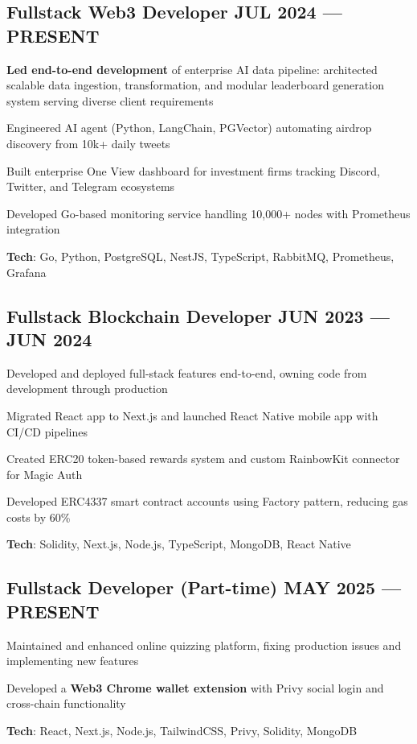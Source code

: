 \documentclass[letter,10pt]{article}
\begin{document}
\subsection{{Fullstack Web3 Developer \hfill JUL 2024 --- PRESENT}}
\begin{zitemize}
  \item \textbf{Led end-to-end development} of enterprise AI data pipeline: architected scalable data ingestion, transformation, and modular leaderboard generation system serving diverse client requirements
  \item Engineered AI agent (Python, LangChain, PGVector) automating airdrop discovery from 10k+ daily tweets
  \item Built enterprise One View dashboard for investment firms tracking Discord, Twitter, and Telegram ecosystems
  \item Developed Go-based monitoring service handling 10,000+ nodes with Prometheus integration
  \item \textbf{Tech}: Go, Python, PostgreSQL, NestJS, TypeScript, RabbitMQ, Prometheus, Grafana
\end{zitemize}


\subsection{{Fullstack Blockchain Developer \hfill JUN 2023 --- JUN 2024}}
\begin{zitemize}
  \item Developed and deployed full-stack features end-to-end, owning code from development through production
  \item Migrated React app to Next.js and launched React Native mobile app with CI/CD pipelines
  \item Created ERC20 token-based rewards system and custom RainbowKit connector for Magic Auth
  \item Developed ERC4337 smart contract accounts using Factory pattern, reducing gas costs by 60\%
  \item \textbf{Tech}: Solidity, Next.js, Node.js, TypeScript, MongoDB, React Native
\end{zitemize}

\subsection{{Fullstack Developer (Part-time) \hfill MAY 2025 --- PRESENT}}
\begin{zitemize}
  \item Maintained and enhanced online quizzing platform, fixing production issues and implementing new features
  \item Developed a \textbf{Web3 Chrome wallet extension} with Privy social login and cross-chain functionality
  \item \textbf{Tech}: React, Next.js, Node.js, TailwindCSS, Privy, Solidity, MongoDB
\end{zitemize}
\end{document}
